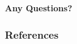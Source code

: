 \documentclass[english,hangout]{beamer}
\begin{document}
\begin{frame}[plain]
	\begin{center}
		\textbf{Any Questions?}
	\end{center}
\end{frame}

\begin{frame}
	\frametitle{References}
	
\end{frame}


%
% 
%
%
%
%
%
%
%
%
\end{document}
